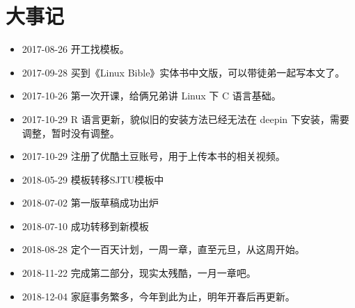 \documentclass[doctor,openright,twoside]{sjtuthesis}
\providecommand{\tightlist}{%
    \setlength{\itemsep}{0pt}\setlength{\parskip}{0pt}}
\theoremstyle{plain}
\theoremstyle{definition}
\theoremstyle{remark}
\theoremstyle{ocrenumbox}
\theoremstyle{plain}
\begin{document}
\hypertarget{history}{%
\chapter{大事记}\label{history}}

\begin{itemize}
\tightlist
\item
  2017-08-26 开工找模板。
\item
  2017-09-28 买到《Linux Bible》实体书中文版，可以带徒弟一起写本文了。
\item
  2017-10-26 第一次开课，给俩兄弟讲 Linux 下 C 语言基础。
\item
  2017-10-29 R 语言更新，貌似旧的安装方法已经无法在 deepin 下安装，需要调整，暂时没有调整。
\item
  2017-10-29 注册了优酷土豆账号，用于上传本书的相关视频。
\item
  2018-05-29 模板转移SJTU模板中
\item
  2018-07-02 第一版草稿成功出炉
\item
  2018-07-10 成功转移到新模板
\item
  2018-08-28 定个一百天计划，一周一章，直至元旦，从这周开始。
\item
  2018-11-22 完成第二部分，现实太残酷，一月一章吧。
\item
  2018-12-04 家庭事务繁多，今年到此为止，明年开春后再更新。
\end{itemize}

\backmatter	%

\printindex

\printbibliography[heading=bibintoc]
\end{document}
